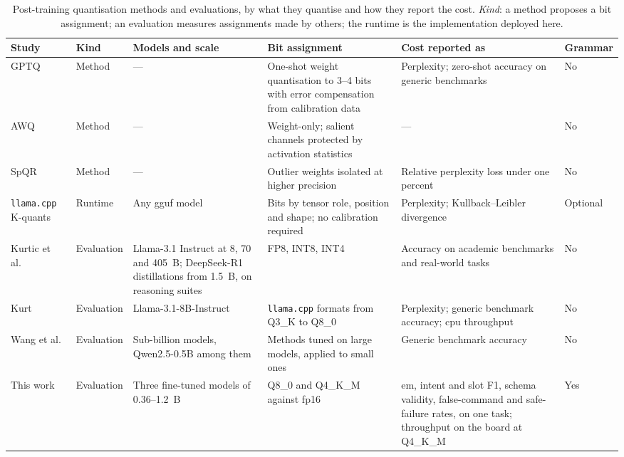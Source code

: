 \begin{table}[htbp]
\centering
\footnotesize
\caption[Quantisation methods and evaluations]{Post-training quantisation methods and
evaluations, by what they quantise and how they report the cost. \emph{Kind}: a method proposes
a bit assignment; an evaluation measures assignments made by others; the runtime is the
implementation deployed here.}
\label{tab:soa-quantisation}
\begin{tabularx}{\textwidth}{@{}>{\raggedright\arraybackslash}p{2.2cm} >{\raggedright\arraybackslash}p{1.7cm} >{\raggedright\arraybackslash}p{2.2cm} >{\raggedright\arraybackslash}X >{\raggedright\arraybackslash}X >{\raggedright\arraybackslash}p{1.6cm}@{}}
\toprule
Study & Kind & Models and scale & Bit assignment & Cost reported as & Grammar \\
\midrule
GPTQ~\cite{gptq} & Method & --- & One-shot weight quantisation to 3--4 bits with error compensation from calibration data & Perplexity; zero-shot accuracy on generic benchmarks & No \\
AWQ~\cite{awq} & Method & --- & Weight-only; salient channels protected by activation statistics & --- & No \\
SpQR~\cite{spqr} & Method & --- & Outlier weights isolated at higher precision & Relative perplexity loss under one percent & No \\
\texttt{llama.cpp} K-quants~\cite{llamacpp} & Runtime & Any \gls{gguf} model & Bits by tensor role, position and shape; no calibration required & Perplexity; Kullback--Leibler divergence & Optional \\
Kurtic et al.~\cite{kurtic2025} & Evaluation & Llama-3.1 Instruct at 8, 70 and 405~B; DeepSeek-R1 distillations from 1.5~B, on reasoning suites & FP8, INT8, INT4 & Accuracy on academic benchmarks and real-world tasks & No \\
Kurt~\cite{kurt2026} & Evaluation & Llama-3.1-8B-Instruct & \texttt{llama.cpp} formats from Q3\_K to Q8\_0 & Perplexity; generic benchmark accuracy; \gls{cpu} throughput & No \\
Wang et al.~\cite{slmquant} & Evaluation & Sub-billion models, Qwen2.5-0.5B among them & Methods tuned on large models, applied to small ones & Generic benchmark accuracy & No \\
\midrule
This work & Evaluation & Three fine-tuned models of 0.36--1.2~B & Q8\_0 and Q4\_K\_M against fp16 & \gls{em}, intent and slot F1, schema validity, false-command and safe-failure rates, on one task; throughput on the board at Q4\_K\_M & Yes \\
\bottomrule
\end{tabularx}
\end{table}

